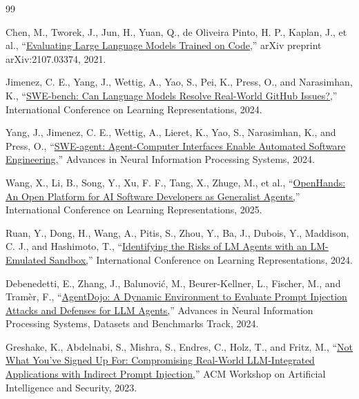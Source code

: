 \documentclass[12pt,a4paper,oneside]{report}
\begin{document}
\clearpage

\begingroup
\renewcommand{\bibname}{Bibliography}
\begin{thebibliography}{99}
 Chen, M., Tworek, J., Jun, H., Yuan, Q., de Oliveira Pinto, H. P., Kaplan, J., et al., ``\href{https://arxiv.org/abs/2107.03374}{Evaluating Large Language Models Trained on Code,}'' arXiv preprint arXiv:2107.03374, 2021.

 Jimenez, C. E., Yang, J., Wettig, A., Yao, S., Pei, K., Press, O., and Narasimhan, K., ``\href{https://openreview.net/forum?id=VTF8yNQM66}{SWE-bench: Can Language Models Resolve Real-World GitHub Issues?,}'' International Conference on Learning Representations, 2024.

 Yang, J., Jimenez, C. E., Wettig, A., Lieret, K., Yao, S., Narasimhan, K., and Press, O., ``\href{https://proceedings.neurips.cc/paper_files/paper/2024/hash/5a7c947568c1b1328ccc5230172e1e7c-Abstract-Conference.html}{SWE-agent: Agent-Computer Interfaces Enable Automated Software Engineering,}'' Advances in Neural Information Processing Systems, 2024.

 Wang, X., Li, B., Song, Y., Xu, F. F., Tang, X., Zhuge, M., et al., ``\href{https://arxiv.org/abs/2407.16741}{OpenHands: An Open Platform for AI Software Developers as Generalist Agents,}'' International Conference on Learning Representations, 2025.

 Ruan, Y., Dong, H., Wang, A., Pitis, S., Zhou, Y., Ba, J., Dubois, Y., Maddison, C. J., and Hashimoto, T., ``\href{https://openreview.net/forum?id=GEcwtMk1uA}{Identifying the Risks of LM Agents with an LM-Emulated Sandbox,}'' International Conference on Learning Representations, 2024.

 Debenedetti, E., Zhang, J., Balunović, M., Beurer-Kellner, L., Fischer, M., and Tramèr, F., ``\href{https://proceedings.neurips.cc/paper_files/paper/2024/file/97091a5177d8dc64b1da8bf3e1f6fb54-Paper-Datasets_and_Benchmarks_Track.pdf}{AgentDojo: A Dynamic Environment to Evaluate Prompt Injection Attacks and Defenses for LLM Agents,}'' Advances in Neural Information Processing Systems, Datasets and Benchmarks Track, 2024.

 Greshake, K., Abdelnabi, S., Mishra, S., Endres, C., Holz, T., and Fritz, M., ``\href{https://doi.org/10.1145/3605764.3623985}{Not What You've Signed Up For: Compromising Real-World LLM-Integrated Applications with Indirect Prompt Injection,}'' ACM Workshop on Artificial Intelligence and Security, 2023.


\end{thebibliography}
\end{document}
